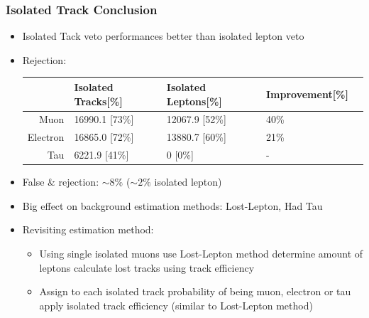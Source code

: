 \documentclass{beamer}
\begin{document}
\begin{frame}
\frametitle{Isolated Track Conclusion}
\begin{itemize}
 \item Isolated Tack veto performances better than isolated lepton veto
 \item Rejection:
  \begin{tabular}{|r|l|l|l|l}
        \hline
                     & Isolated Tracks[\%]    & Isolated Leptons[\%] & Improvement[\%]     \\  \hline
        Muon         &16990.1  [73\%]           & 12067.9 [52\%]         &40\%              \\
        Electron     &16865.0 [72\%]           & 13880.7 [60\%]        &21\%            \\
        Tau          &6221.9 [41\%]            & 0 [0\%]                &-           \\
        \hline
    \end{tabular}
 \item False \ttbar \& \wpj rejection: $\sim 8\%$ ($\sim 2\%$ isolated lepton)
 \item Big effect on background estimation methods: Lost-Lepton, Had Tau
 \item Revisiting estimation method:
 \begin{itemize}
  \item Using single isolated muons use Lost-Lepton method determine amount of leptons calculate lost tracks using track efficiency
  \item Assign to each isolated track probability of being muon, electron or tau apply isolated track efficiency (similar to Lost-Lepton method)
 \end{itemize}


\end{itemize}

\end{frame}

\section{\ZInvJets}
\begin{frame}
  \begin{center}
    \huge\ZInvJets
    
  \end{center}
\end{frame}
\end{document}
